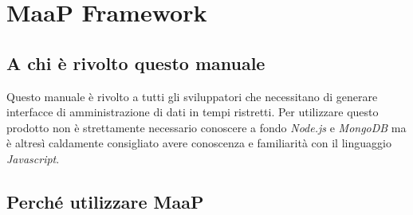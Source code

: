 \section{MaaP Framework}

\subsection{A chi è rivolto questo manuale}

Questo manuale è rivolto a tutti gli sviluppatori che necessitano di generare interfacce di amministrazione di dati in tempi ristretti. Per utilizzare questo prodotto non è strettamente necessario conoscere a fondo \textit{Node.js} e \textit{MongoDB} ma è altresì caldamente consigliato avere conoscenza e familiarità con il linguaggio \textit{Javascript}.

\subsection{Perché utilizzare MaaP}


